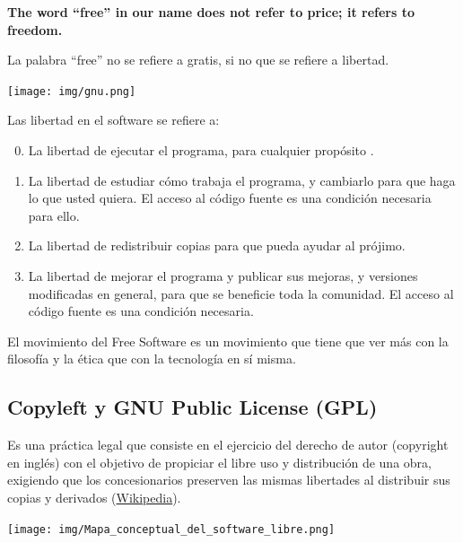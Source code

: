\documentclass{../../../yukibook.cls/yukibook}
\begin{document}
\begin{tcolorbox}[title=Aclarando la palabra “free”:,sidebyside,righthand width=0.12\linewidth]

    \textbf{The word “free” in our name does not refer to price; it refers to freedom.}

    La palabra “free” no se refiere a gratis, si no que se refiere a libertad.

    \tcblower
    \texttt{[image: img/gnu.png]}
\end{tcolorbox}


Las libertad en el software se refiere a:
\begin{tcolorbox}[title=Libertades del Software Libre:]
    \begin{enumerate}
        \setcounter{enumi}{-1}
        \item La libertad de ejecutar el programa, para cualquier propósito .

        \item La libertad de estudiar cómo trabaja el programa, y cambiarlo para que haga lo que usted quiera. El acceso al código fuente es una condición necesaria para ello.

        \item La libertad de redistribuir copias para que pueda ayudar al prójimo.

        \item La libertad de mejorar el programa y publicar sus mejoras, y versiones modificadas en general, para que se beneficie toda la comunidad. El acceso al código fuente es una condición necesaria.
    \end{enumerate}
\end{tcolorbox}

El movimiento del Free Software es un movimiento que tiene que ver más con la filosofía y la ética que con la tecnología en sí misma.


\subsection{Copyleft y GNU Public License (GPL)}
Es una práctica legal que consiste en el ejercicio del derecho de autor (copyright en inglés) con el objetivo de propiciar el libre uso y distribución de una obra, exigiendo que los concesionarios preserven las mismas libertades al distribuir sus copias y derivados (\href{https://es.wikipedia.org/wiki/Copyleft}{Wikipedia}).

\begin{center}
  \texttt{[image: img/Mapa\_conceptual\_del\_software\_libre.png]}
  \vspace{-30pt}\vspace{-20pt}
\end{center}
\end{document}

